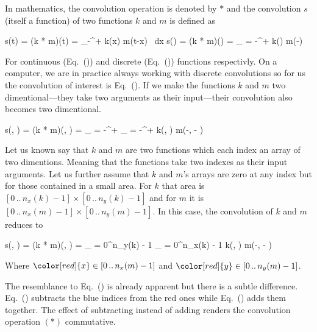 In mathematics, the convolution operation is denoted by $*$ and the convolution $s$ (itself a function) of two functions $k$ and $m$ is defined as

\startplaceformula[reference=cont-conv]
\startformula
s(t) = (k * m)(t) = \int_{{-}\infty}^{{+}\infty} k(x) \cdot m(t-x) \, {\rm d}x
\stopformula
\stopplaceformula
\startplaceformula[reference=disc-conv]
\startformula
s(\color[red]{x}) = (k * m)(\color[red]{x}) = \sum_{\color[blue]{x} = {-}\infty}^{{+}\infty} k(\color[blue]{x}) \cdot m(\color[red]{x}-\color[blue]{x})
\stopformula
\stopplaceformula

For continuous (Eq.~()) and discrete (Eq.~()) functions respectivly.
On a computer, we are in practice always working with discrete convolutions so for us the convolution of interest is Eq.~().
If we make the functions $k$ and $m$ two dimentional---they take two arguments as their input---their convolution also becomes two dimentional.

\startplaceformula[reference=twodim-disc-conv]
\startformula
s(\color[red]{x}, \color[red]{y}) = (k * m)(\color[red]{x}, \color[red]{y}) =
\sum_{\color[blue]{y} = {-}\infty}^{{+}\infty}
\sum_{\color[blue]{x} = {-}\infty}^{{+}\infty}
k(\color[blue]{x}, \color[blue]{y}) \cdot m(\color[red]{x}-\color[blue]{x}, \color[red]{y} - \color[blue]{y})
\stopformula
\stopplaceformula

\indentation
Let us known say that $k$ and $m$ are two functions which each index an array of two dimentions.
Meaning that the functions take two indexes as their input arguments.
Let us further assume that $k$ and $m$'s arrays are zero at any index but for those contained in a small area.
For $k$ that area is $[0 \, .. \, n_x(k) - 1] \times [0 \, .. \, n_y(k) - 1]$ and for $m$ it is $[0 \, .. \, n_x(m) - 1] \times [0 \, .. \, n_y(m) - 1]$.
In this case, the convolution of $k$ and $m$ reduces to

\startplaceformula[reference=twodim-disc-conv-finite]
\startformula
s(\color[red]{x}, \color[red]{y}) = (k * m)(\color[red]{x}, \color[red]{y}) = 
\sum_{\color[blue]{y} = 0}^{n_y(k) - 1} 
\sum_{\color[blue]{x} = 0}^{n_x(k) - 1} 
k(\color[blue]{x}, \color[blue]{y}) \cdot m(\color[red]{x}-\color[blue]{x}, \color[red]{y} - \color[blue]{y})
\stopformula
\stopplaceformula

Where $\color[red]{x} \in [0 \, .. \, n_x(m) - 1]$ and $\color[red]{y} \in [0 \, .. \, n_y(m) - 1]$.

The resemblance to Eq.~() is already apparent but there is a subtle difference.
Eq.~() subtracts the blue indices from the red ones while Eq.~() adds them together.
The effect of subtracting instead of adding renders the convolution operation $(*)$ commutative.

